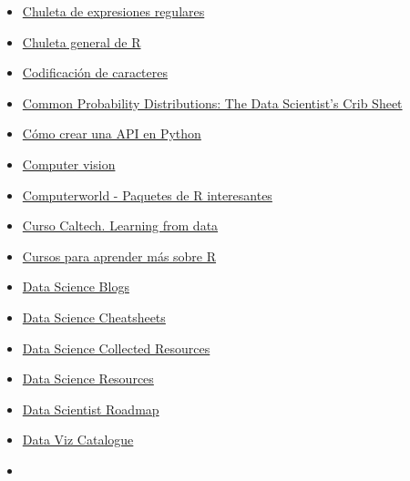 \documentclass[
]{article}
\begin{document}
\begin{itemize}
{  Group}. The repository below provides examples of statistical
  methodology in different software and languages, along with a
  comparison of the results obtained and description of any
  discrepancies.
\item
  \href{https://github.com/rstudio/cheatsheets/blob/main/regex.pdf}{Chuleta
  de expresiones regulares}
\item
  \href{https://cran.r-project.org/doc/contrib/Baggott-refcard-v2.pdf}{Chuleta
  general de R}
\item
  \href{https://www.joelonsoftware.com/2003/10/08/the-absolute-minimum-every-software-developer-absolutely-positively-must-know-about-unicode-and-character-sets-no-excuses/}{Codificación
  de caracteres}
\item
  \href{https://blog.cloudera.com/blog/2015/12/common-probability-distributions-the-data-scientists-crib-sheet/?utm_content=buffer49e9f&utm_medium=social&utm_source=facebook.com&utm_campaign=buffer}{Common
  Probability Distributions: The Data Scientist's Crib Sheet}
\item
  \href{https://anderfernandez.com/blog/como-crear-api-en-python/}{Cómo
  crear una API en Python}
\item
  \href{https://github.com/kjw0612/awesome-deep-vision}{Computer vision}
\item
  \href{https://www.computerworld.com/article/1375862/great-r-packages-for-data-import-wrangling-visualization.html}{Computerworld
  - Paquetes de R interesantes}
\item
  \href{https://work.caltech.edu/telecourse.html}{Curso Caltech.
  Learning from data}
\item
  \href{https://datos.gob.es/es/noticia/cursos-para-aprender-mas-sobre-r}{Cursos
  para aprender más sobre R}
\item
  \href{https://github.com/rushter/data-science-blogs}{Data Science
  Blogs}
\item
  \href{https://github.com/FavioVazquez/ds-cheatsheets}{Data Science
  Cheatsheets}
\item
  \href{https://github.com/tirthajyoti/Data-science-best-resources}{Data
  Science Collected Resources}
\item
  \href{https://github.com/jonathan-bower/DataScienceResources}{Data
  Science Resources}
\item
  \href{https://github.com/MrMimic/data-scientist-roadmap}{Data
  Scientist Roadmap}
\item
  \href{https://graphica.app/catalogue}{Data Viz Catalogue}
\item

\end{itemize}
\end{document}
